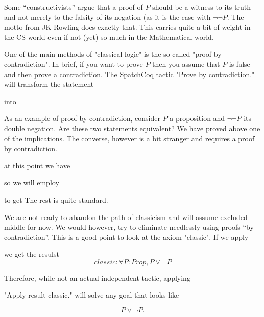 Some ``constructivists'' argue that a proof of $P$ should be a witness to its truth and not merely to the falsity of its negation (as it is the case with $\neg \neg P$.  The motto from JK Rowling does exactly that. This carries quite a bit of weight in the CS world even if not (yet) so much in the Mathematical world.

One of the main methods of "classical logic" is the so called "proof by contradiction". In brief, if you want to prove $P$ then you assume that $P$ is false and then prove a contradiction. The SpatchCoq tactic 
"Prove by contradiction." will transform the statement


into 


As an example of proof by contradiction, consider $P$ a proposition and $\neg \neg P$ its double negation. Are these two statements equivalent? We have proved above one of the implications. The converse, however is a bit stranger and requires a proof by contradiction.



at this point we have 


so we will employ 

to get
 The rest is quite standard.

We are not ready to abandon the path of classicism and will assume excluded middle for now. We would however, try to eliminate needlessly using proofs ``by contradiction''.
This is a good point to look at the axiom "classic". If we apply

we get the resulst $$classic
    : \forall  P : Prop, P \lor \neg P$$


Therefore, while not an actual independent tactic, applying

"Apply result classic."
will solve any goal that looks like

$$P \lor \neg P.$$


